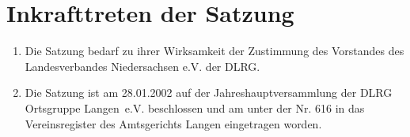 \documentclass[%
12pt, %
a4paper, %
headsepline, %
footsepline, %
parskip, %
headings=normal, %
]{scrartcl}
\begin{document}
\section{Inkrafttreten der Satzung}
\label{sec:inkrafttreten}
\begin{enumerate}
    \item Die Satzung bedarf zu ihrer Wirksamkeit der Zustimmung des Vorstandes des Landesverbandes Niedersachsen e.V. der DLRG.
    \item Die Satzung ist am 28.01.2002 auf der Jahreshauptversammlung der DLRG Ortsgruppe Langen~e.V. beschlossen und am \hspace{1.5cm} unter der Nr. 616 in das Vereinsregister des Amtsgerichts Langen eingetragen worden.
\end{enumerate}
\end{document}
